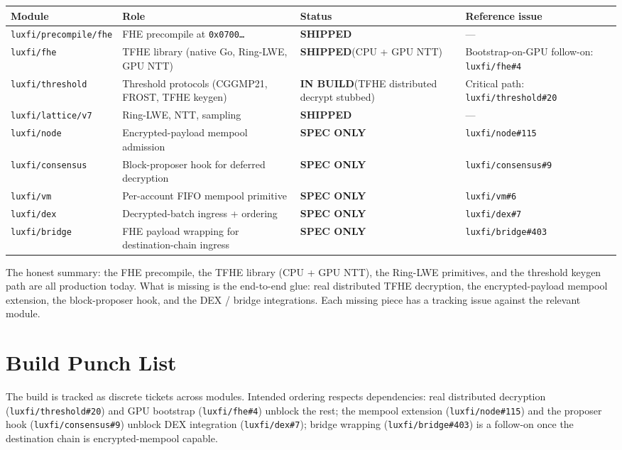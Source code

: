 \documentclass[11pt,a4paper]{article}
\newcommand{\done}{\textcolor{statusdone}{\textbf{SHIPPED}}}
\newcommand{\indev}{\textcolor{statusdev}{\textbf{IN BUILD}}}
\newcommand{\todesign}{\textcolor{statustodo}{\textbf{SPEC ONLY}}}
\begin{document}
\begin{longtable}{p{3.0cm}p{6.0cm}p{2.0cm}p{4.0cm}}
\toprule
\textbf{Module} & \textbf{Role} & \textbf{Status} & \textbf{Reference issue} \\
\midrule
\texttt{luxfi/precompile/fhe} &
  FHE precompile at \texttt{0x0700\dots} &
  \done & --- \\
\texttt{luxfi/fhe} &
  TFHE library (native Go, Ring-LWE, GPU NTT) &
  \done (CPU + GPU NTT) &
  Bootstrap-on-GPU follow-on: \texttt{luxfi/fhe\#4} \\
\texttt{luxfi/threshold} &
  Threshold protocols (CGGMP21, FROST, TFHE keygen) &
  \indev (TFHE distributed decrypt stubbed) &
  Critical path: \texttt{luxfi/threshold\#20} \\
\texttt{luxfi/lattice/v7} &
  Ring-LWE, NTT, sampling &
  \done & --- \\
\texttt{luxfi/node} &
  Encrypted-payload mempool admission &
  \todesign &
  \texttt{luxfi/node\#115} \\
\texttt{luxfi/consensus} &
  Block-proposer hook for deferred decryption &
  \todesign &
  \texttt{luxfi/consensus\#9} \\
\texttt{luxfi/vm} &
  Per-account FIFO mempool primitive &
  \todesign &
  \texttt{luxfi/vm\#6} \\
\texttt{luxfi/dex} &
  Decrypted-batch ingress + ordering &
  \todesign &
  \texttt{luxfi/dex\#7} \\
\texttt{luxfi/bridge} &
  FHE payload wrapping for destination-chain ingress &
  \todesign &
  \texttt{luxfi/bridge\#403} \\
\bottomrule
\end{longtable}

\noindent The honest summary: the FHE precompile, the TFHE library
(CPU + GPU NTT), the Ring-LWE primitives, and the threshold
keygen path are all production today. What is missing is the
end-to-end glue: real distributed TFHE decryption, the
encrypted-payload mempool extension, the block-proposer hook, and
the DEX / bridge integrations. Each missing piece has a tracking
issue against the relevant module.

\section{Build Punch List}

The build is tracked as discrete tickets across modules. Intended
ordering respects dependencies: real distributed decryption
(\texttt{luxfi/threshold\#20}) and GPU bootstrap
(\texttt{luxfi/fhe\#4}) unblock the rest; the mempool extension
(\texttt{luxfi/node\#115}) and the proposer hook
(\texttt{luxfi/consensus\#9}) unblock DEX integration
(\texttt{luxfi/dex\#7}); bridge wrapping
(\texttt{luxfi/bridge\#403}) is a follow-on once the destination
chain is encrypted-mempool capable.
\end{document}
